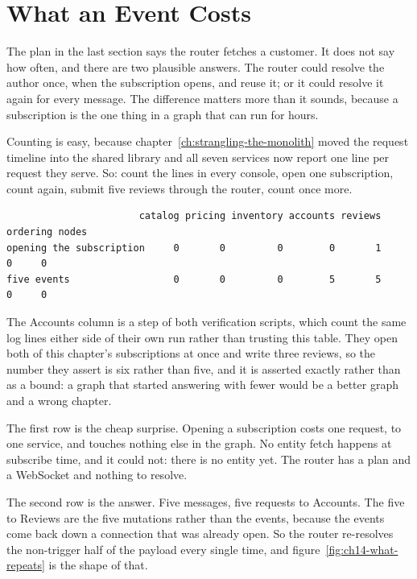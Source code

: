 \section{What an Event Costs}
\label{sec:ch14-what-an-event-costs}
%

The plan in the last section says the router fetches a customer. It does not
say how often, and there are two plausible answers. The router could resolve
the author once, when the subscription opens, and reuse it; or it could resolve
it again for every message. The difference matters more than it sounds, because
a subscription is the one thing in a graph that can run for hours.

Counting is easy, because chapter~\ref{ch:strangling-the-monolith} moved the
request timeline into the shared library and all seven services now report one
line per request they serve. So: count the lines in every console,
open one subscription, count again, submit five reviews through the router,
count once more.

\begin{verbatim}
                       catalog pricing inventory accounts reviews ordering nodes
opening the subscription     0       0         0        0       1        0     0
five events                  0       0         0        5       5        0     0
\end{verbatim}

The Accounts column is a step of both verification scripts, which count the
same log lines either side of their own run rather than trusting this table.
They open both of this chapter's subscriptions at once and write three reviews,
so the number they assert is six rather than five, and it is asserted exactly
rather than as a bound: a graph that started answering with fewer would be a
better graph and a wrong chapter.

%
The first row is the cheap surprise. Opening a subscription costs one request,
to one service, and touches nothing else in the graph. No entity fetch happens
at subscribe time, and it could not: there is no entity yet. The router has a
plan and a WebSocket and nothing to resolve.

%
The second row is the answer. Five messages, five requests to Accounts. The
five to Reviews are the five mutations rather than the events, because the
events come back down a connection that was already open. So the router
re-resolves the non-trigger half of the payload every single time, and
figure~\ref{fig:ch14-what-repeats} is the shape of that.

